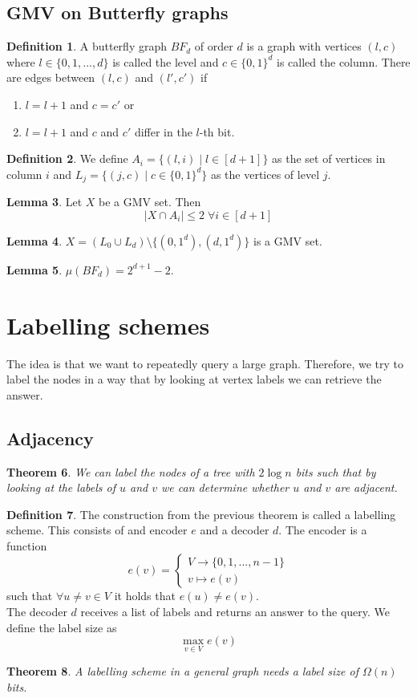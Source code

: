 \documentclass[a4paper, 12pt]{article}
\theoremstyle{plain}
\newtheorem{theorem}{Theorem}[section] %
\theoremstyle{definition}
\newtheorem{definition}[theorem]{Definition} %
\theoremstyle{lemma}
\newtheorem{lemma}[theorem]{Lemma}
\theoremstyle{remark}
\theoremstyle{corollary}
\theoremstyle{example}
\begin{document}
	\subsection{GMV on Butterfly graphs}
	\begin{definition}
		A butterfly graph $BF_d$ of order $d$ is a graph with vertices $(l,c)$ where $l \in \{0,1,...,d\}$ is called the level and $c \in \{0,1\}^d$ is called the column. There are edges between $(l,c)$ and $(l',c')$ if \begin{enumerate}
			\item $l = l+1$ and $c=c'$ or 
			\item $l=l+1$ and $c$ and $c'$ differ in the $l$-th bit.
		\end{enumerate}
	\end{definition}
	\begin{definition}
		We define $A_i = \{(l,i) \mid l \in [d+1]\}$ as the set of vertices in column $i$ and $L_j = \{(j,c) \mid c \in \{0,1\}^d\}$ as the vertices of level $j$.
	\end{definition}
	\begin{lemma}
		Let $X$ be a GMV set. Then \[\left|X \cap A_i\right| \leq 2 \;\forall i \in [d+1]\]
	\end{lemma}
	\begin{lemma}
		$X = (L_0 \cup L_d) \setminus \{(0,1^d), (d,1^d)\}$ is a GMV set.
	\end{lemma}
	\begin{lemma}
		$\mu(BF_d) = 2^{d+1} - 2$.
	\end{lemma}
	\section{Labelling schemes}
	The idea is that we want to repeatedly query a large graph. Therefore, we try to label the nodes in a way that by looking at vertex labels we can retrieve the answer.
	\subsection{Adjacency}
	\begin{theorem}
		We can label the nodes of a tree with $2\log n$ bits such that by looking at the labels of $u$ and $v$ we can determine whether $u$ and $v$ are adjacent.
	\end{theorem}
	\begin{definition}
		The construction from the previous theorem is called a labelling scheme. This consists of and encoder $e$ and a decoder $d$. The encoder is a function \[e(v) = \begin{cases}
			V \to \{0,1,...,n-1\}\\
			v \mapsto e(v)
		\end{cases}\]
	such that $\forall u \neq v \in V$ it holds that $e(u) \neq e(v)$.\\
	The decoder $d$ receives a list of labels and returns an answer to the query. We define the label size as \[\max_{v \in V} e(v)\]
	\end{definition}
	\begin{theorem}
		A labelling scheme in a general graph needs a label size of $\Omega(n)$ bits.
	\end{theorem}
\end{document}
